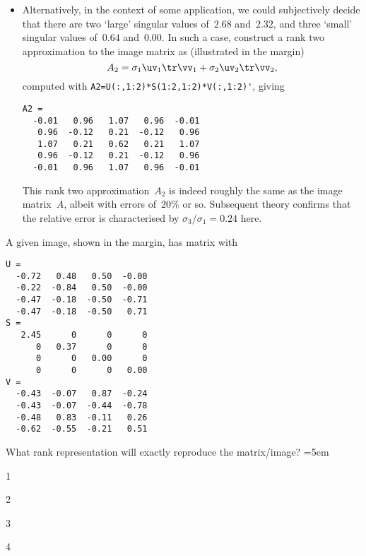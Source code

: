 \begin{example}
\begin{solution}
\begin{itemize}
\item Alternatively, in the context of some application, we could subjectively decide that there are two `large' singular values of~\(2.68\) and~\(2.32\), and three `small' singular values of~\(0.64\) and~\(0.00\).
In such a case, construct a rank two approximation to the image matrix as (illustrated in the margin)
\marginpar{}
\begin{equation*}
A_2=\sigma_1\uv_1\tr\vv_1+\sigma_2\uv_2\tr\vv_2,
\end{equation*}
computed with \verb|A2=U(:,1:2)*S(1:2,1:2)*V(:,1:2)'|, giving \twodp
\begin{verbatim}
A2 =
  -0.01   0.96   1.07   0.96  -0.01
   0.96  -0.12   0.21  -0.12   0.96
   1.07   0.21   0.62   0.21   1.07
   0.96  -0.12   0.21  -0.12   0.96
  -0.01   0.96   1.07   0.96  -0.01
\end{verbatim}
This rank two approximation~\(A_2\) is indeed roughly the same as the image matrix~\(A\), albeit with errors of~20\% or so.
Subsequent theory confirms that the relative error is characterised by \(\sigma_3/\sigma_1=0.24\) here.
\end{itemize}
\end{solution}
\end{example}




\begin{activity}
A given image, shown in the margin, has matrix with \svd\ \twodp
\marginpar{}%
\begin{verbatim}
U =
  -0.72   0.48   0.50  -0.00
  -0.22  -0.84   0.50  -0.00
  -0.47  -0.18  -0.50  -0.71
  -0.47  -0.18  -0.50   0.71
S =
   2.45      0      0      0
      0   0.37      0      0
      0      0   0.00      0
      0      0      0   0.00
V =
  -0.43  -0.07   0.87  -0.24
  -0.43  -0.07  -0.44  -0.78
  -0.48   0.83  -0.11   0.26
  -0.62  -0.55  -0.21   0.51
\end{verbatim}
What rank representation will exactly reproduce the matrix\slash image?
\partswidth=5em
\begin{parts}
\item 1
\item 2
\item 3
\item 4
\end{parts}
\end{activity}





